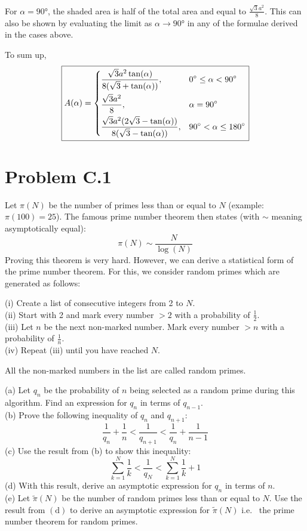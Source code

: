 \documentclass{article}
\begin{document}
\noindent
For $\alpha = \ang{90}$, the shaded area is half of the total area and equal to $\frac{\sqrt{3}a^2}{8}$. This can also be shown by evaluating the limit as $\alpha \rightarrow \ang{90}$ in any of the formulae derived in the cases above.
\medskip

\noindent
To sum up,
\[\boxed{
    A(\alpha)=
\begin{dcases}
    \frac{\sqrt{3}a^2 \tan(\alpha)}{8(\sqrt{3}+\tan(\alpha))},           & \ang{0} \leq \alpha < \ang{90} \\
    \frac{\sqrt{3}a^2}{8},                                               & \alpha = \ang{90} \\
    \frac{\sqrt{3}a^2(2\sqrt{3}-\tan(\alpha))}{8(\sqrt{3}-\tan(\alpha))}, & \ang{90} < \alpha \leq \ang{180}
\end{dcases}
}
\]

\newpage
\section*{Problem C.1}
Let $\pi(N)$ be the number of primes less than or equal to $N$ (example: $\pi(100)=25$). The famous prime number theorem then states (with $\sim$ meaning asymptotically equal):
\[
\pi(N) \sim \frac{N}{\log (N)}
\]
Proving this theorem is very hard. However, we can derive a statistical form of the prime number theorem. For this, we consider random primes which are generated as follows:
\medskip

\noindent
(i) Create a list of consecutive integers from 2 to $N$. \\
(ii) Start with 2 and mark every number $>2$ with a probability of $\frac{1}{2}$. \\
(iii) Let $n$ be the next non-marked number. Mark every number $>n$ with a probability of $\frac{1}{n}$. \\
(iv) Repeat (iii) until you have reached $N$.
\medskip

\noindent
All the non-marked numbers in the list are called random primes.
\medskip

\noindent
(a) Let $q_{n}$ be the probability of $n$ being selected as a random prime during this algorithm. Find an expression for $q_{n}$ in terms of $q_{n-1}$. \\
(b) Prove the following inequality of $q_{n}$ and $q_{n+1}$:
\[
\frac{1}{q_{n}}+\frac{1}{n}<\frac{1}{q_{n+1}}<\frac{1}{q_{n}}+\frac{1}{n-1}
\]
(c) Use the result from (b) to show this inequality:
\[
\sum_{k=1}^{N} \frac{1}{k}<\frac{1}{q_{N}}<\sum_{k=1}^{N} \frac{1}{k}+1
\]
(d) With this result, derive an asymptotic expression for $q_{n}$ in terms of $n$. \\
(e) Let $\tilde{\pi}(N)$ be the number of random primes less than or equal to $N$. Use the result from $(\mathrm{d})$ to derive an asymptotic expression for $\tilde{\pi}(N)$ i.e. \ the prime number theorem for random primes.
\end{document}
